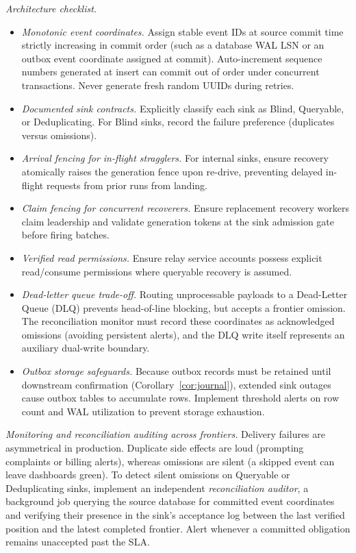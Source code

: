 \documentclass[sigplan,10pt]{acmart}
\theoremstyle{plain}
\theoremstyle{definition}
\begin{document}
\emph{Architecture checklist.}
\begin{itemize}
\item \emph{Monotonic event coordinates.} Assign stable event IDs at source
  commit time strictly increasing in commit order (such as a database WAL LSN
  or an outbox event coordinate assigned at commit). Auto-increment sequence
  numbers generated at insert can commit out of order under concurrent transactions.
  Never generate fresh random UUIDs during retries.
\item \emph{Documented sink contracts.} Explicitly classify each sink as
  Blind, Queryable, or Deduplicating. For Blind sinks, record the failure
  preference (duplicates versus omissions).
\item \emph{Arrival fencing for in-flight stragglers.} For internal sinks,
  ensure recovery atomically raises the generation fence upon re-drive,
  preventing delayed in-flight requests from prior runs from landing.
\item \emph{Claim fencing for concurrent recoverers.} Ensure replacement
  recovery workers claim leadership and validate generation tokens at the
  sink admission gate before firing batches.
\item \emph{Verified read permissions.} Ensure relay service accounts
  possess explicit read/consume permissions where queryable recovery is
  assumed.
\item \emph{Dead-letter queue trade-off.} Routing unprocessable payloads
  to a Dead-Letter Queue (DLQ) prevents head-of-line blocking, but accepts
  a frontier omission. The reconciliation monitor must record these coordinates
  as acknowledged omissions (avoiding persistent alerts), and the DLQ write
  itself represents an auxiliary dual-write boundary.
\item \emph{Outbox storage safeguards.} Because outbox records must be
  retained until downstream confirmation (Corollary~\ref{cor:journal}),
  extended sink outages cause outbox tables to accumulate rows. Implement
  threshold alerts on row count and WAL utilization to prevent storage
  exhaustion.
\end{itemize}

\emph{Monitoring and reconciliation auditing across frontiers.}
Delivery failures are asymmetrical in production. Duplicate side effects are
loud (prompting complaints or billing alerts), whereas omissions are silent
(a skipped event can leave dashboards green).
To detect silent omissions on Queryable or Deduplicating sinks, implement an
independent \emph{reconciliation auditor}, a background job querying the source
database for committed event coordinates and verifying their presence in the
sink's acceptance log between the last verified position and the latest completed
frontier. Alert whenever a committed obligation remains unaccepted past the SLA.
\end{document}
